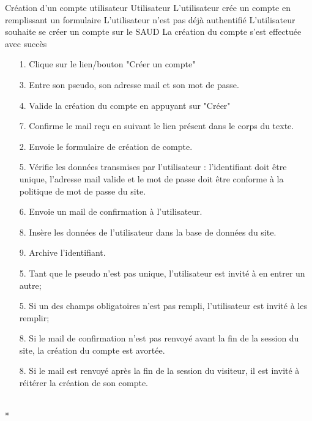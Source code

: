 \documentclass[a4paper,11pt,french]{article}
\begin{document}
\fiche
	{Création d'un compte utilisateur}
	{Utilisateur}
	{L'utilisateur crée un compte en remplissant un formulaire}
	{L'utilisateur n'est pas déjà authentifié}
	{L'utilisateur souhaite se créer un compte sur le SAUD}
	{La création du compte s'est effectuée avec succès}
	{\begin{itemize}
	    \item[]
	  \item[1.] Clique sur le lien/bouton "Créer un compte"
	  \item[3.] Entre son pseudo, son adresse mail et son mot de passe.
	  \item[4.] Valide la création du compte en appuyant sur "Créer"
	  \item[7.] Confirme le mail reçu en suivant le lien présent dans 
	  le corps du texte.
	\end{itemize}
	}
	{\begin{itemize}
        \item[]
		\item[2.] Envoie le formulaire de création de compte.
		\item[5.] Vérifie les données transmises par l'utilisateur : 
        l'identifiant doit être unique, l'adresse mail valide et le mot
        de passe doit être conforme à la politique de mot de passe
        du site.
        \item [6.] Envoie un mail de confirmation à l'utilisateur.
        \item [8.] Insère les données de l'utilisateur dans la base de données du site.
        \item [9.] Archive l'identifiant.
	\end{itemize}
	}
	{}
\flots
    {\begin{itemize}
    \item[]
    \item[5.] Tant que le pseudo n'est pas unique, l'utilisateur est invité à en entrer un autre;
    \item[5.] Si un des champs obligatoires n'est pas rempli, l'utilisateur est invité à les remplir;
    \end{itemize}
    }
	{\begin{itemize}
    \item[]
    \item[8.] Si le mail de confirmation n'est pas renvoyé avant la fin de la session du site,
    la création du compte est avortée.
    \item[8.] Si le mail est renvoyé après la fin de la session du visiteur,
        il est invité à réitérer la création de son compte.
    \end{itemize}
    }    
\\*
\end{document}
